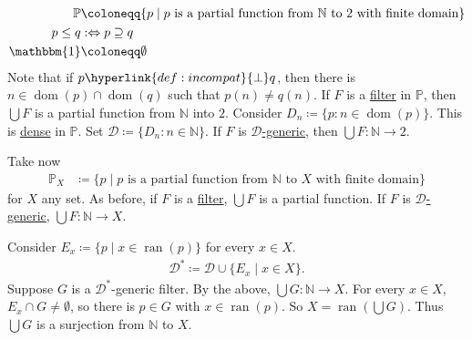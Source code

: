 \documentclass{article}
\newcommand{\named}[1]{\textbf{#1}\index{#1}}
\newcommand{\1}{\mathbbm{1}}
\DeclareMathOperator{\dom}{dom}
\DeclareMathOperator{\ran}{ran}
\begin{document}
\begin{defi}
\end{defi}

\begin{eg}
  \begin{align*}
    \mathbb{P} &\coloneqq \{p \mid p\text{ is a partial function from }\mathbb{N}\text{ to }2\text{ with finite domain}\} \\
    p \leq q &:\Leftrightarrow p \supseteq q \\
    \mathbbm{1} &\coloneqq \emptyset
  \end{align*}
  Note that if $p \hyperlink{def:incompat}{\perp} q$, then there is $n \in \dom(p) \cap \dom(q)$ such that $p(n) \neq q(n)$.
  If $F$ is a \hyperlink{def:filter}{filter} in $\mathbb{P}$, then $\bigcup F$ is a partial function from $\mathbb{N}$ into $2$.
  Consider $D_n \coloneqq \{p : n \in \dom(p)\}$.
  This is \hyperlink{def:dense}{dense} in $\mathbb{P}$.
  Set $\mathcal{D} \coloneqq \{D_n : n \in \mathbb{N}\}$.
  If $F$ is \hyperlink{def:dgeneric}{$\mathcal{D}$-generic}, then $\bigcup F: \mathbb{N} \to 2$.
\end{eg}
\begin{eg}
  Take now
  \begin{align*}
    \mathbb{P}_X &\coloneqq \{p \mid p\text{ is a partial function from }\mathbb{N}\text{ to }X\text{ with finite domain}\}
  \end{align*}
  for $X$ any set.
  As before, if $F$ is a \hyperlink{def:filter}{filter}, $\bigcup F$ is a partial function.
  If $F$ is \hyperlink{def:dgeneric}{$\mathcal{D}$-generic}, $\bigcup F: \mathbb{N} \to X$.

  Consider $E_x \coloneqq \{p \mid x \in \ran(p)\}$ for every $x \in X$.
  \begin{align*}
    \mathcal{D}^* \coloneqq \mathcal{D} \cup \{E_x \mid x \in X\}.
  \end{align*}
  Suppose $G$ is a $\mathcal{D}^*$-generic filter. By the above, $\bigcup G: \mathbb{N} \to X$.
  For every $x \in X$, $E_x \cap G \neq \emptyset$, so there is $p \in G$ with $x \in \ran(p)$.
  So $X = \ran(\bigcup G)$.
  Thus $\bigcup G$ is a surjection from $\mathbb{N}$ to $X$. %
\end{eg}
\end{document}
